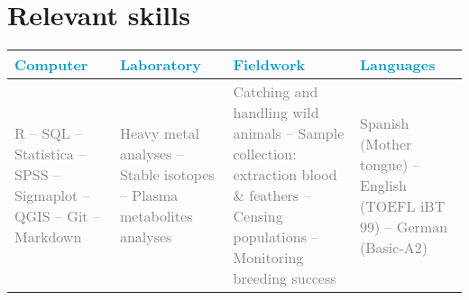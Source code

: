 \documentclass[11pt, a4paper]{awesome-cv}
\begin{document}
\hypertarget{relevant-skills}{%
\section{Relevant skills}\label{relevant-skills}}

\begin{tabular}[t]{>{\centering\arraybackslash}p{4cm}>{\centering\arraybackslash}p{4cm}>{\centering\arraybackslash}p{4cm}>{\centering\arraybackslash}p{4cm}}
\toprule
\textcolor[HTML]{009acd}{\textbf{Computer}} & \textcolor[HTML]{009acd}{\textbf{Laboratory}} & \textcolor[HTML]{009acd}{\textbf{Fieldwork}} & \textcolor[HTML]{009acd}{\textbf{Languages}}\\
\midrule
\textcolor[HTML]{7f7f7f}{R -- SQL -- Statistica -- SPSS -- Sigmaplot -- QGIS -- Git -- Markdown} & \textcolor[HTML]{7f7f7f}{Heavy metal analyses -- Stable isotopes -- Plasma metabolites analyses} & \textcolor[HTML]{7f7f7f}{Catching and handling wild animals -- Sample collection: extraction blood \& feathers -- Censing populations -- Monitoring breeding success} & \textcolor[HTML]{7f7f7f}{Spanish (Mother tongue) -- English (TOEFL iBT 99) -- German (Basic-A2)}\\
\bottomrule
\end{tabular}
\end{document}
